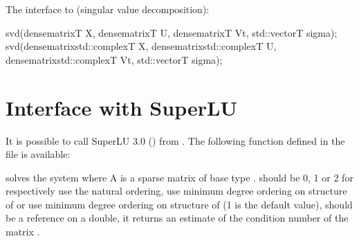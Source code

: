 \documentclass[a4paper,11pt,english]{sphinxmanual}
\begin{document}
The interface to  (singular value decomposition):

\begin{sphinxVerbatim}[commandchars=\\\{\}]
svd(dense\PYGZus{}matrix\PYGZlt{}T\PYGZgt{} \PYGZam{}X, dense\PYGZus{}matrix\PYGZlt{}T\PYGZgt{} \PYGZam{}U,
    dense\PYGZus{}matrix\PYGZlt{}T\PYGZgt{} \PYGZam{}Vt, std::vector\PYGZlt{}T\PYGZgt{} sigma);
svd(dense\PYGZus{}matrix\PYGZlt{}std::complex\PYGZlt{}T\PYGZgt{} \PYGZgt{} \PYGZam{}X, dense\PYGZus{}matrix\PYGZlt{}std::complex\PYGZlt{}T\PYGZgt{} \PYGZgt{} \PYGZam{}U,
    dense\PYGZus{}matrix\PYGZlt{}std::complex\PYGZlt{}T\PYGZgt{} \PYGZgt{} \PYGZam{}Vt, std::vector\PYGZlt{}T\PYGZgt{} sigma);
\end{sphinxVerbatim}


\chapter{Interface with SuperLU}
\label{\detokenize{gmm/superlu:interface-with-superlu}}\label{\detokenize{gmm/superlu:gmm-superlu}}\label{\detokenize{gmm/superlu::doc}}
It is possible to call SuperLU 3.0 () from . The following function defined in the file  is available:

\begin{sphinxVerbatim}[commandchars=\\\{\}]
      
\end{sphinxVerbatim}

solves the system  where A is a sparse matrix of base type .  should be 0, 1 or 2 for respectively use the natural ordering, use minimum degree ordering on structure of  or use minimum degree ordering on structure of  (1 is the default value),  should be a reference on a double, it returns an estimate of the condition number of the matrix .
\end{document}

